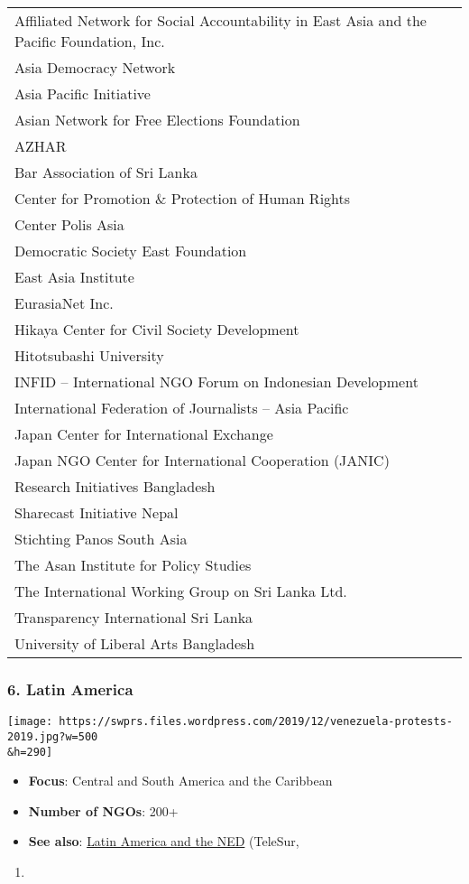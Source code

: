 \begin{longtable}[]{@{}l@{}}
\toprule
\endhead
Affiliated Network for Social Accountability in East Asia and the
Pacific Foundation, Inc.\tabularnewline
Asia Democracy Network\tabularnewline
Asia Pacific Initiative\tabularnewline
Asian Network for Free Elections Foundation\tabularnewline
AZHAR\tabularnewline
Bar Association of Sri Lanka\tabularnewline
Center for Promotion \& Protection of Human Rights\tabularnewline
Center Polis Asia\tabularnewline
Democratic Society East Foundation\tabularnewline
East Asia Institute\tabularnewline
EurasiaNet Inc.\tabularnewline
Hikaya Center for Civil Society Development\tabularnewline
Hitotsubashi University\tabularnewline
INFID -- International NGO Forum on Indonesian
Development\tabularnewline
International Federation of Journalists -- Asia Pacific\tabularnewline
Japan Center for International Exchange\tabularnewline
Japan NGO Center for International Cooperation (JANIC)\tabularnewline
Research Initiatives Bangladesh\tabularnewline
Sharecast Initiative Nepal\tabularnewline
Stichting Panos South Asia\tabularnewline
The Asan Institute for Policy Studies\tabularnewline
The International Working Group on Sri Lanka Ltd.\tabularnewline
Transparency International Sri Lanka\tabularnewline
University of Liberal Arts Bangladesh\tabularnewline
\bottomrule
\end{longtable}

\hypertarget{6-latin-america}{%
\subsubsection{6. Latin America}\label{6-latin-america}}

\texttt{[image: https://swprs.files.wordpress.com/2019/12/venezuela-protests-2019.jpg?w=500\\\&h=290]}

\begin{itemize}
\tightlist
\item
  \textbf{Focus}: Central and South America and the Caribbean
\item
  \textbf{Number of NGOs}: 200+
\item
  \textbf{See also}:
  \href{https://www.telesurenglish.net/analysis/National-Endowment-for-Destabilization-CIA-Funds-for-Latin-America-in-2018-20190403-0042.html}{Latin
  America and the NED} (TeleSur,
\end{itemize}

\begin{enumerate}
\def\labelenumi{\arabic{enumi})}
\setcounter{enumi}{2018}
\item
\end{enumerate}

